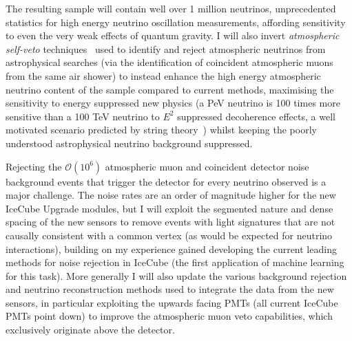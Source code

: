 \documentclass[a4paper,11pt]{article}
\begin{document}
The resulting sample will contain well over 1 million neutrinos, unprecedented statistics for high energy neutrino oscillation measurements, affording sensitivity to even the very weak effects of quantum gravity. I will also invert \textit{atmospheric self-veto} techniques~\cite{PhysRevD.90.023009, Arguelles_2018} used to identify and reject atmospheric neutrinos from astrophysical searches (via the identification of coincident atmospheric muons from the same air shower) to instead enhance the high energy atmospheric neutrino content of the sample compared to current methods, maximising the sensitivity to energy suppressed new physics (a PeV neutrino is 100 times more sensitive than a 100 TeV neutrino to $E^2$ suppressed decoherence effects, a well motivated scenario predicted by string theory~\cite{Ellis:1997jw, doi:10.1142/S0217732397000248}) whilst keeping the poorly understood astrophysical neutrino background suppressed.


Rejecting the $\mathcal{O}(10^6)$ atmospheric muon and coincident detector noise background events that trigger the detector for every neutrino observed is a major challenge. The noise rates are an order of magnitude higher for the new IceCube Upgrade modules, but I will exploit the segmented nature and dense spacing of the new sensors to remove events with light signatures that are not causally consistent with a common vertex (as would be expected for neutrino interactions), building on my experience gained developing the current leading methods for noise rejection in IceCube (the first application of machine learning for this task). More generally I will also update the various background rejection and neutrino reconstruction methods used to integrate the data from the new sensors, in particular exploiting the upwards facing PMTs (all current IceCube PMTs point down) to improve the atmospheric muon veto capabilities, which exclusively originate above the detector.


\end{document}
